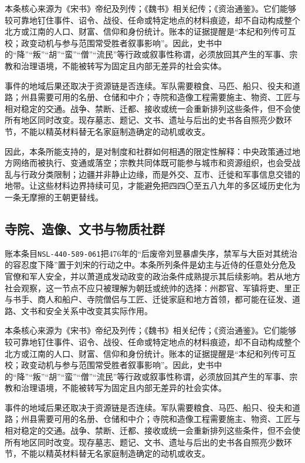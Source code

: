 本条核心来源为《宋书》帝纪及列传；《魏书》相关纪传；《资治通鉴》。它们能够较可靠地钉住事件、诏令、战役、任命或特定地点的材料痕迹，却不自动构成整个北方或江南的人口、财富、信仰和身份统计。账本的证据提醒是“本纪和列传可互校；政变动机与参与范围常受胜者叙事影响”。因此，史书中的“降”“叛”“胡”“蛮”“僧”“流民”等行政或叙事性称谓，必须放回其产生的军事、宗教和治理语境，不能被转写为固定且内部无差异的社会实体。

事件的地域后果还取决于资源链是否连续。军队需要粮食、马匹、船只、役夫和道路；州县需要可用的名册、仓储和中介；寺院和造像工程需要施主、物资、工匠与相对稳定的交通。战争、禁断、迁都、接收或统一会重新排列这些条件，但不会使所有地区同时改变。现存墓志、题记、文书、遗址与后出的史书各自照亮少数环节，不能以精英材料替无名家庭制造确定的动机或收支。

因此，本条所能支持的，是对制度和社群如何相遇的限定性解释：中央政策通过地方网络而被执行、变通或落空；宗教共同体既可能参与城市和资源组织，也会受战乱与行政分类限制；边疆并非静止边缘，而是外交、互市、迁徙和军事信息交错的地带。让这些材料边界持续可见，才能避免把四四〇至五八九年的多区域历史化为一条无摩擦的王朝更替线。

\subsection{寺院、造像、文书与物质社群}

账本条目\texttt{NSL-440-589-061}把476年的“后废帝刘昱暴虐失序，禁军与大臣对其统治的容忍度下降”置于刘宋的行动之中。本条所列条件是幼主与近侍的任意处分危及官僚和军人安全，并以萧道成发动政变的政治条件成熟提示其后续影响。若从地方社会观察，这一节点不应只被理解为朝廷或统帅的选择：州郡官、军镇将吏、里正与书手、商人和船户、寺院僧侣与工匠、迁徙家庭和地方首领，都可能在征发、道路、文书和安全关系中改变其实际作用。

本条核心来源为《宋书》帝纪及列传；《魏书》相关纪传；《资治通鉴》。它们能够较可靠地钉住事件、诏令、战役、任命或特定地点的材料痕迹，却不自动构成整个北方或江南的人口、财富、信仰和身份统计。账本的证据提醒是“本纪和列传可互校；政变动机与参与范围常受胜者叙事影响”。因此，史书中的“降”“叛”“胡”“蛮”“僧”“流民”等行政或叙事性称谓，必须放回其产生的军事、宗教和治理语境，不能被转写为固定且内部无差异的社会实体。

事件的地域后果还取决于资源链是否连续。军队需要粮食、马匹、船只、役夫和道路；州县需要可用的名册、仓储和中介；寺院和造像工程需要施主、物资、工匠与相对稳定的交通。战争、禁断、迁都、接收或统一会重新排列这些条件，但不会使所有地区同时改变。现存墓志、题记、文书、遗址与后出的史书各自照亮少数环节，不能以精英材料替无名家庭制造确定的动机或收支。

